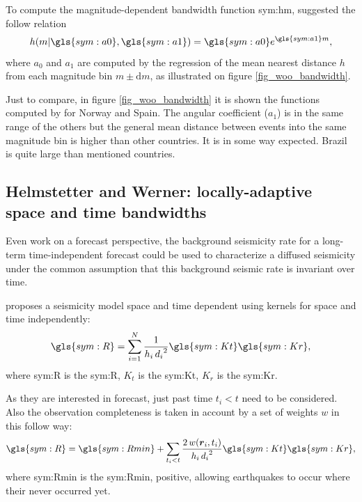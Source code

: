\documentclass[draft, grl]{agutex}
\begin{document}
\begin{article}
To compute the magnitude-dependent bandwidth function \gls{sym:hm}, \citet{woo_1996} suggested the follow relation
\begin{equation}
	\ensuremath{
		h(m\arrowvert \gls{sym:a0}, \gls{sym:a1}) = \gls{sym:a0}e^{\gls{sym:a1}m},
	}
	\label{eq:hm}
\end{equation}
where $a_0$ and $a_1$ are computed by the regression of the mean nearest distance $h$ from each magnitude bin $m \pm \mathrm{d}m$, as illustrated on figure \ref{fig_woo_bandwidth}.

Just to compare, in figure \ref{fig_woo_bandwidth} it is shown the functions computed by \citet{beauval_2003} for Norway and Spain. The angular coefficient ($a_1$) is in the same range of the others but the general mean distance between events into the same magnitude bin is higher than other countries. It is in some way expected. Brazil is quite large than mentioned countries.



\subsection{Helmstetter and Werner: locally-adaptive space and time bandwidths}


Even work on a forecast perspective, the background seismicity rate for a long-term time-independent forecast could be used to characterize a diffused seismicity under the common assumption that this background seismic rate is invariant over time.

\citet{helmstetter_2012} proposes a seismicity model space and time dependent using kernels for space and time independently:
\begin{equation}
	\ensuremath{\gls{sym:R} = \sum_{i=1}^{N}{ \frac{1}{h_i\,{d_i}^2} \gls{sym:Kt}\gls{sym:Kr} }},
	\label{eq:helms01}
\end{equation}
where \gls{sym:R} is the \glsdesc{sym:R},
	  $K_t$ is the \glsdesc{sym:Kt},
	  $K_r$ is the \glsdesc{sym:Kr}.


As they are interested in forecast, just past time $t_i < t$ need to be considered. Also the observation completeness is taken in account by a set of weights $w$ in this follow way:
\begin{equation}
\ensuremath{\gls{sym:R} = \gls{sym:Rmin} + \sum_{t_i < t}{
	\frac{2\,w(\boldsymbol{r}_i,t_i)}{h_i\,{d_i}^2}
			\gls{sym:Kt}\gls{sym:Kr} }},
	\label{eq:helms02}
\end{equation}
where \gls{sym:Rmin} is the \glsdesc{sym:Rmin}, positive, allowing earthquakes to occur where their never occurred yet.


\end{article}
\end{document}
